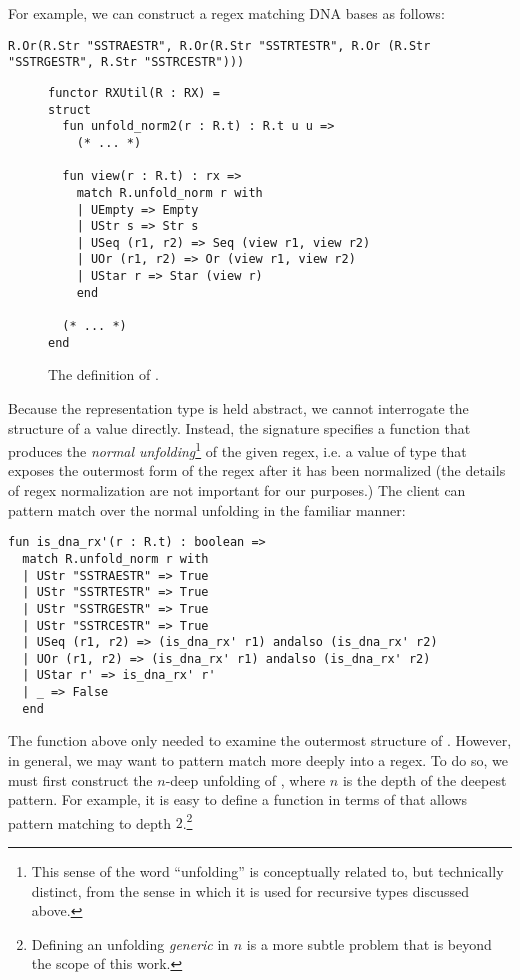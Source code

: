 For example, we can construct a regex matching DNA bases as follows:
\begin{lstlisting}[numbers=none]
R.Or(R.Str "SSTRAESTR", R.Or(R.Str "SSTRTESTR", R.Or (R.Str "SSTRGESTR", R.Str "SSTRCESTR")))
\end{lstlisting}

\begin{figure}
\begin{lstlisting}[numbers=none]
functor RXUtil(R : RX) = 
struct
  fun unfold_norm2(r : R.t) : R.t u u => 
    (* ... *)

  fun view(r : R.t) : rx => 
    match R.unfold_norm r with 
    | UEmpty => Empty
    | UStr s => Str s
    | USeq (r1, r2) => Seq (view r1, view r2)
    | UOr (r1, r2) => Or (view r1, view r2)
    | UStar r => Star (view r)
    end 

  (* ... *)
end
\end{lstlisting}
\caption{The definition of .}
\label{fig:RXUtil}
\end{figure}

Because the representation type is held abstract, we cannot interrogate the structure of a value  directly. Instead, the signature specifies a function  that produces the \emph{normal unfolding}\footnote{This sense of the word ``unfolding'' is conceptually related to, but technically distinct, from the sense in which it is used for recursive types discussed above.} of the given regex, i.e. a value of type  that exposes the outermost form of the regex after it has been normalized (the details of regex normalization are not important for our purposes.) The client can pattern match over the {normal unfolding} in the familiar manner:
\begin{lstlisting}[numbers=none]
fun is_dna_rx'(r : R.t) : boolean => 
  match R.unfold_norm r with 
  | UStr "SSTRAESTR" => True
  | UStr "SSTRTESTR" => True
  | UStr "SSTRGESTR" => True
  | UStr "SSTRCESTR" => True
  | USeq (r1, r2) => (is_dna_rx' r1) andalso (is_dna_rx' r2)
  | UOr (r1, r2) => (is_dna_rx' r1) andalso (is_dna_rx' r2)
  | UStar r' => is_dna_rx' r'
  | _ => False
  end
\end{lstlisting}

The function above only needed to examine the outermost structure of . However, in general, we may want to pattern match more deeply into a regex. To do so, we must first construct the $n$-deep unfolding of , where $n$ is the depth of the deepest pattern. For example, it is easy to define a function  in terms of  that allows pattern matching to depth $2$.\footnote{Defining an unfolding \emph{generic} in $n$ is a more subtle problem that is beyond the scope of this work.} 

